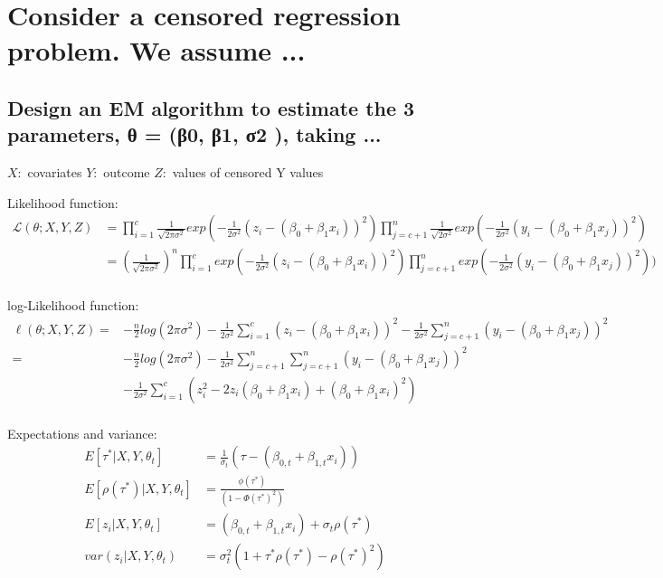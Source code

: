 \documentclass{article}\usepackage[]{graphicx}\usepackage[]{color}
\begin{document}
\section{Consider a censored regression problem. We assume ...}

\subsection{Design an EM algorithm to estimate the 3 parameters, θ = (β0, β1, σ2
), taking ...}


$X:$ covariates
$Y:$ outcome
$Z:$ values of censored Y values

Likelihood function:
$$\begin{aligned}
\mathcal{L}(\theta; X, Y, Z) &= \prod_{i=1}^c \frac{1}{\sqrt{2\pi\sigma^2}} exp(-\frac{1}{2\sigma^2} (z_i - (\beta_0 + \beta_1 x_i))^2) \prod_{j=c+1}^n  \frac{1}{\sqrt{2\sigma^2}}   exp(-\frac{1}{2\sigma^2} (y_i - (\beta_0 + \beta_1 x_j))^2) \\
&= (\frac{1}{\sqrt{2\pi\sigma^2}})^n \prod_{i=1}^c  exp(-\frac{1}{2\sigma^2} (z_i - (\beta_0 + \beta_1 x_i))^2) \prod_{j=c+1}^n     exp(-\frac{1}{2\sigma^2} (y_i - (\beta_0 + \beta_1 x_j))^2)) \\
\end{aligned}$$

log-Likelihood function:
$$\begin{aligned}
\ell(\theta;X,Y,Z)=& -\frac{n}{2} log(2\pi \sigma^2) - \frac{1}{2\sigma^2} \sum^c_{i=1} (z_i - (\beta_0 + \beta_1x_i))^2 - \frac{1}{2\sigma^2} \sum^n_{j=c+1} (y_i - (\beta_0 + \beta_1x_j))^2 \\
=& -\frac{n}{2}log(2\pi\sigma^2) - \frac{1}{2\sigma^2} \sum_{j=c+1}^n \sum^n_{j=c+1} (y_i - (\beta_0 + \beta_1x_j))^2 \\
&- \frac{1}{2\sigma^2} \sum^c_{i=1} (z_i^2 - 2z_i (\beta_0 + \beta_1 x_i) + (\beta_0 + \beta_1x_i)^2) \\
\end{aligned}$$

Expectations and variance:
$$\begin{aligned}
E[\tau^*|X,Y,\theta_t] &= \frac{1}{\sigma_t}  (\tau - (\beta_{0,t} + \beta_{1,t}x_i)) \\
E[\rho(\tau^*) |X,Y,\theta_t] &= \frac{\phi(\tau^*)}{(1-\Phi(\tau^*)^2)} \\
E[z_i|X,Y,\theta_t] &= (\beta_{0,t} + \beta_{1,t}x_i) + \sigma_t\rho(\tau^*) \\
var(z_i | X,Y,\theta_t) &= \sigma^2_t (1 + \tau^* \rho (\tau^*) - \rho(\tau^*)^2)
\end{aligned}$$
\end{document}
